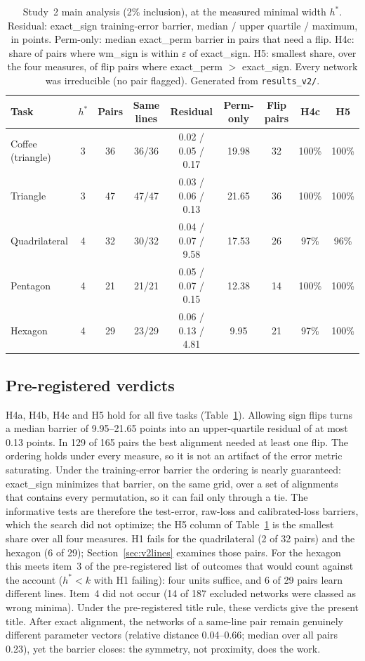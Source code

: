 \documentclass[11pt]{article}
\newcommand{\md}[1]{\textsf{#1}}
\newcommand{\eps}{\varepsilon}
\begin{document}
\begin{table}[t]
\centering\small
\caption{Study~2 main analysis (2\% inclusion), at the measured minimal width $h^*$. Residual: \md{exact\_sign} training-error barrier, median / upper quartile / maximum, in points. Perm-only: median \md{exact\_perm} barrier in pairs that need a flip. H4c: share of pairs where \md{wm\_sign} is within $\eps$ of \md{exact\_sign}. H5: smallest share, over the four measures, of flip pairs where \md{exact\_perm} $>$ \md{exact\_sign}. Every network was irreducible (no pair flagged). Generated from \texttt{results\_v2/}.}
\label{tab:v2}
\begin{tabular}{@{}lcccccccc@{}}
\toprule
Task & $h^*$ & Pairs & Same lines & Residual & Perm-only & Flip pairs & H4c & H5 \\
\midrule
Coffee (triangle) & 3 & 36 & 36/36 & 0.02 / 0.05 / 0.17 & 19.98 & 32 & 100\% & 100\% \\
Triangle & 3 & 47 & 47/47 & 0.03 / 0.06 / 0.13 & 21.65 & 36 & 100\% & 100\% \\
Quadrilateral & 4 & 32 & 30/32 & 0.04 / 0.07 / 9.58 & 17.53 & 26 & 97\% & 96\% \\
Pentagon & 4 & 21 & 21/21 & 0.05 / 0.07 / 0.15 & 12.38 & 14 & 100\% & 100\% \\
Hexagon & 4 & 29 & 23/29 & 0.06 / 0.13 / 4.81 & 9.95 & 21 & 97\% & 100\% \\
\bottomrule
\end{tabular}
\end{table}

\subsection{Pre-registered verdicts}
\label{sec:v2verdicts}

H4a, H4b, H4c and H5 hold for all five tasks (Table~\ref{tab:v2}). Allowing sign flips turns a median barrier of 9.95--21.65 points into an upper-quartile residual of at most 0.13 points. In 129 of 165 pairs the best alignment needed at least one flip. The ordering holds under every measure, so it is not an artifact of the error metric saturating. Under the training-error barrier the ordering is nearly guaranteed: \md{exact\_sign} minimizes that barrier, on the same grid, over a set of alignments that contains every permutation, so it can fail only through a tie. The informative tests are therefore the test-error, raw-loss and calibrated-loss barriers, which the search did not optimize; the H5 column of Table~\ref{tab:v2} is the smallest share over all four measures. H1 fails for the quadrilateral (2 of 32 pairs) and the hexagon (6 of 29); Section~\ref{sec:v2lines} examines those pairs. For the hexagon this meets item~3 of the pre-registered list of outcomes that would count against the account ($h^* < k$ with H1 failing): four units suffice, and 6 of 29 pairs learn different lines. Item~4 did not occur (14 of 187 excluded networks were classed as wrong minima). Under the pre-registered title rule, these verdicts give the present title. After exact alignment, the networks of a same-line pair remain genuinely different parameter vectors (relative distance 0.04--0.66; median over all pairs 0.23), yet the barrier closes: the symmetry, not proximity, does the work.
\end{document}
